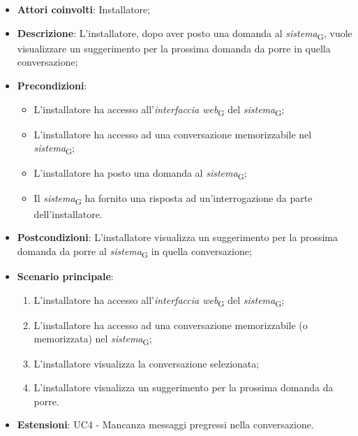 \begin{itemize}
    \item \textbf{Attori coinvolti}: Installatore;
    \item \textbf{Descrizione}: L'installatore, dopo aver posto una domanda al \textit{sistema}\textsubscript{G}, vuole visualizzare un suggerimento per la prossima domanda da porre in quella conversazione;
    \item \textbf{Precondizioni}: 
    \begin{itemize}
        \item L’installatore ha accesso all’\textit{interfaccia web}\textsubscript{G} del \textit{sistema}\textsubscript{G};
        \item L’installatore ha accesso ad una conversazione memorizzabile nel \textit{sistema}\textsubscript{G};
        \item L'installatore ha posto una domanda al \textit{sistema}\textsubscript{G};
        \item Il \textit{sistema}\textsubscript{G} ha fornito una risposta ad un’interrogazione da parte dell’installatore.
    \end{itemize}
    \item \textbf{Postcondizioni}: L'installatore visualizza un suggerimento per la prossima domanda da porre al \textit{sistema}\textsubscript{G} in quella conversazione;
    \item \textbf{Scenario principale}:
    \begin{enumerate}
        \item L’installatore ha accesso all’\textit{interfaccia web}\textsubscript{G} del \textit{sistema}\textsubscript{G};
        \item L’installatore ha accesso ad una conversazione memorizzabile (o memorizzata) nel \textit{sistema}\textsubscript{G};
        \item L'installatore visualizza la conversazione selezionata;
        \item L'installatore visualizza un suggerimento per la prossima domanda da porre.
    \end{enumerate}
    \item \textbf{Estensioni}: UC4 - Mancanza messaggi pregressi nella conversazione.
\end{itemize}

